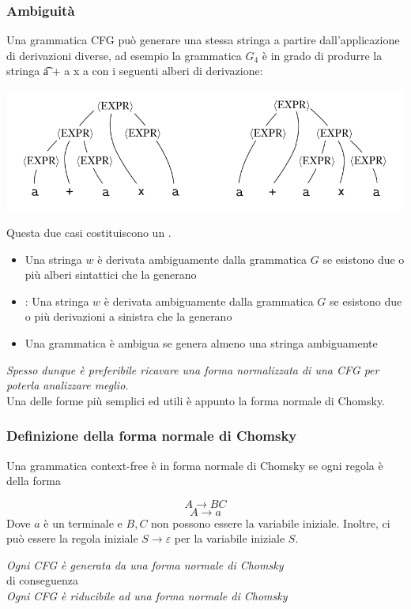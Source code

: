 \subsubsection{Ambiguità}
Una grammatica CFG può generare una stessa stringa a partire dall'applicazione di derivazioni diverse, ad esempio la grammatica $G_4$ è in grado di produrre la stringa 
\t{a + a x a}  con i seguenti alberi di derivazione:\\
\begin{center}
	\includegraphics[scale=0.5]{img/ambiguita.png}\\
\end{center}
Questa due casi costituiscono un .
\begin{itemize}
	\item Una stringa $w$ è derivata ambiguamente dalla grammatica $G$ se esistono due o più alberi sintattici che la generano
	\item {}: Una stringa $w$ è derivata ambiguamente dalla grammatica $G$
		se esistono due o più derivazioni a sinistra che la generano
	\item Una grammatica è ambigua se genera almeno una stringa ambiguamente
\end{itemize}
\textit{Spesso dunque è preferibile ricavare una forma normalizzata di una CFG per poterla analizzare meglio.}\\
Una delle forme più semplici ed utili è appunto la forma normale di Chomsky. 

\subsubsection{Definizione della forma normale di Chomsky}
Una grammatica context-free è in forma normale di Chomsky se ogni regola è della forma 

$$A\rightarrow BC$$
$$A \rightarrow a$$Dove $a$ è un terminale e $B, C$ non possono essere la variabile iniziale. 
Inoltre, ci può essere la regola iniziale $S\rightarrow\varepsilon$ per la variabile iniziale $S$.

\begin{center}
	\textit{Ogni CFG è generata da una forma normale di Chomsky}\\
	di conseguenza\\
	\textit{Ogni CFG è riducibile ad una forma normale di Chomsky}
\end{center}

